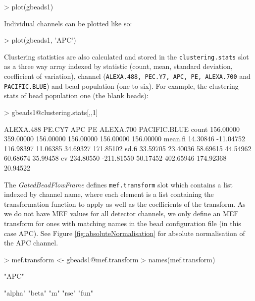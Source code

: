 \documentclass[11pt]{article}
\newcommand{\Robject}[1]{{\texttt{#1}}}
\newcommand{\Rclass}[1]{{\textit{#1}}}
\begin{document}
\begin{Schunk}
\begin{Sinput}
> plot(gbeads1)
\end{Sinput}
\end{Schunk}


\noindent
Individual channels can be plotted like so:
\begin{Schunk}
\begin{Sinput}
> plot(gbeads1, 'APC')
\end{Sinput}
\end{Schunk}

\noindent
Clustering statistics are also calculated and stored in the \Robject{clustering.stats} slot as
a three way array indexed
by statistic (count, mean, standard deviation, coefficient of variation),
channel (\texttt{ALEXA.488, PEC.Y7, APC, PE, ALEXA.700} and \texttt{PACIFIC.BLUE})
and bead population (one to six).
For example, the clustering stats of bead population one (the blank beads):

\begin{Schunk}
\begin{Sinput}
> gbeads1@clustering.stats[,,1]
\end{Sinput}
\begin{Soutput}
        ALEXA.488     PE.CY7       APC        PE ALEXA.700 PACIFIC.BLUE
count   156.00000  359.00000 156.00000 156.00000 156.00000    156.00000
mean.fi  14.30846  -11.04752 116.98397  11.06385  34.69327    171.85102
sd.fi    33.59705   23.40036  58.69615  44.54962  60.68674     35.99458
cv      234.80550 -211.81550  50.17452 402.65946 174.92368     20.94522
\end{Soutput}
\end{Schunk}


The \Rclass{GatedBeadFlowFrame} defines \Robject{mef.transform} slot which contains a list indexed by channel
name, where each element is a list containing the transformation function to apply as well as the coefficients of the transform.
As we do not have MEF values for all detector channels, we only define an MEF transform for ones with matching names in the bead configuration file (in this case APC).
See Figure \ref{fig:absoluteNormalisation} for absolute normalisation of the APC channel.

\begin{Schunk}
\begin{Sinput}
> mef.transform <- gbeads1@mef.transform
> names(mef.transform)
\end{Sinput}
\begin{Soutput}
[1] "APC"
\end{Soutput}
\begin{Soutput}
[1] "alpha" "beta"  "m"     "rse"   "fun"  
\end{Soutput}
\end{Schunk}
\end{document}
